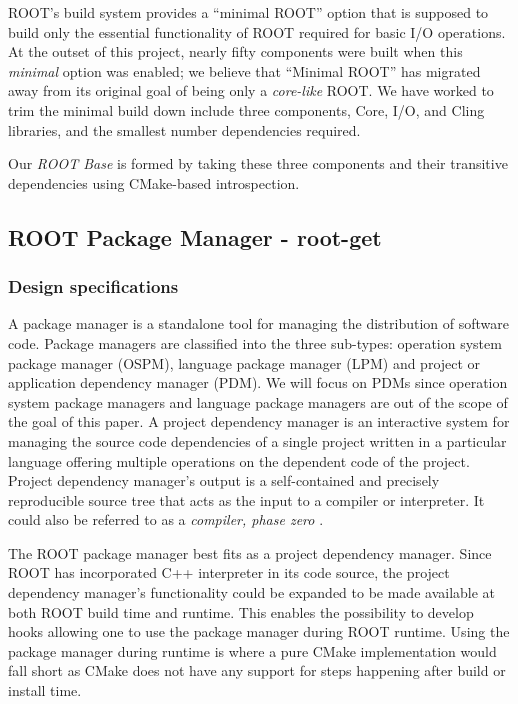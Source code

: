 \documentclass{webofc}
\begin{document}
ROOT's build system provides a “minimal ROOT” option that is supposed to build only the essential functionality of ROOT required for basic I/O operations. At the outset of this project, nearly fifty components were built when this \textit{minimal} option was enabled; we believe that “Minimal ROOT” has migrated away from its original goal of being only a \textit{core-like} ROOT. We have worked to trim the minimal build down include three components, Core, I/O, and Cling libraries, and the smallest number dependencies required.

Our \textit{ROOT Base} is formed by taking these three components and their transitive dependencies using CMake-based introspection.

\subsection{ROOT Package Manager - root-get}
\subsubsection{Design specifications}
A package manager is a standalone tool for managing the distribution of software code.  Package managers are classified into the three sub-types: operation system package manager (OSPM), language package manager (LPM) and project or application dependency manager (PDM). We will focus on PDMs since operation system package managers and language package managers are out of the scope of the goal of this paper. A project dependency manager is an interactive system for managing the source code dependencies of a single project written in a particular language offering multiple operations on the dependent code of the project. Project dependency manager's output is a self-contained and precisely reproducible source tree that acts as the input to a compiler or interpreter. It could also be referred to as a \textit{compiler, phase zero} \cite{pdm}.

The ROOT package manager best fits as a project dependency manager. Since ROOT has incorporated C++ interpreter in its code source, the project dependency manager's functionality could be expanded to be made available at both ROOT build time and runtime. This enables the possibility to develop hooks allowing one to use the package manager during ROOT runtime. Using the package manager during runtime is where a pure CMake implementation would fall short as CMake does not have any support for steps happening after build or install time.
\end{document}
